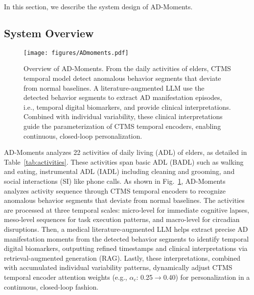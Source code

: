 \documentclass[sigconf, anonymous, 9pt, nonacm]{acmart}
\newcommand{\sys}{AD-Moments\xspace}
\begin{document}
In this section, we describe the system design of \sys.

\subsection{System Overview}

\begin{figure}[t]
\centering
\texttt{[image: figures/ADmoments.pdf]}
\caption{Overview of \sys. 
From the daily activities of elders, CTMS temporal model detect anomalous behavior segments that deviate from normal baselines.
A literature-augmented LLM use the detected behavior segments to extract AD manifestation episodes, i.e., temporal digital biomarkers, and provide clinical interpretations.
Combined with individual variability, these clinical interpretations guide the parameterization of
CTMS temporal encoders, enabling continuous, closed-loop personalization. }
\label{fig:system_overview}
\vspace{-1em}
\end{figure}

\sys analyzes 22 activities of daily living (ADL) of elders, as detailed in Table~\ref{tab:activities}.
These activities span basic ADL (BADL) such as walking and eating, instrumental ADL (IADL) including cleaning and grooming, and social interactions (SI) like phone calls. 
As shown in Fig.~\ref{fig:system_overview}, \sys analyzes activity sequence through CTMS temporal encoders to recognize anomalous behavior segments that deviate from normal baselines. 
The activities are processed at three temporal scales: micro-level for immediate cognitive lapses, meso-level sequences for task execution patterns, and macro-level for circadian disruptions.
Then, a medical literature-augmented LLM helps extract precise AD manifestation moments from the detected behavior segments to identify temporal digital biomarkers, outputting refined timestamps and clinical interpretations via retrieval-augmented generation (RAG).
Lastly, these interpretations, combined with accumulated individual variability patterns, dynamically adjust CTMS temporal encoder attention weights (e.g., $\alpha_{c}$: 0.25$\rightarrow$0.40) for personalization in a continuous, closed-loop fashion.
\end{document}
